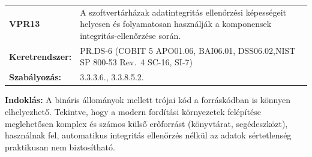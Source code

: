 \documentclass[12pt,magyar,a4paper,oneside]{scrreprt}
\begin{document}
\begin{longtable}[]{@{}ll@{}}
\toprule
\endhead
\begin{minipage}[t]{0.16\columnwidth}\raggedright
\textbf{VPR13}\strut
\end{minipage} & \begin{minipage}[t]{0.79\columnwidth}\raggedright
A szoftvertárházak adatintegritás ellenőrzési képességeit helyesen és
folyamatosan használják a komponensek integritás-ellenőrzése
során.\strut
\end{minipage}\tabularnewline
\begin{minipage}[t]{0.16\columnwidth}\raggedright
\textbf{Keretrendszer:}\strut
\end{minipage} & \begin{minipage}[t]{0.79\columnwidth}\raggedright
PR.DS-6 (COBIT 5 APO01.06, BAI06.01, DSS06.02,NIST SP 800-53 Rev.~4
SC-16, SI-7)\strut
\end{minipage}\tabularnewline
\begin{minipage}[t]{0.16\columnwidth}\raggedright
\textbf{Szabályozás:}\strut
\end{minipage} & \begin{minipage}[t]{0.79\columnwidth}\raggedright
3.3.3.6., 3.3.8.5.2.\strut
\end{minipage}\tabularnewline
\bottomrule
\end{longtable}

\textbf{Indoklás: } A bináris állományok mellett trójai kód a
forráskódban is könnyen elhelyezhető. Tekintve, hogy a modern fordítási
környezetek felépítése meglehetősen komplex és számos külső erőforrást
(könyvtárat, segédeszközt), használnak fel, automatikus integritás
ellenőrzés nélkül az adatok sértetlenség praktikusan nem biztosítható.
\end{document}
